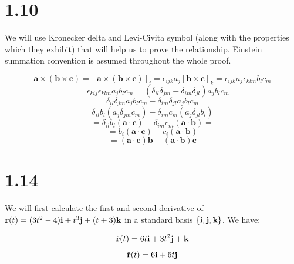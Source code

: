 \documentclass{article}
\begin{document}
\section*{1.10}

We will use Kronecker delta and Levi-Civita symbol (along with the properties which they exhibit)
that will help us to prove the relationship. Einstein
summation convention is assumed throughout the whole proof.


\begin{equation*}
    \mathbf{a} \times (\mathbf{b} \times \mathbf{c}) = [\mathbf{a} \times (\mathbf{b} \times \mathbf{c})]_{i} = \epsilon_{ijk}a_{j}[\mathbf{b} \times \mathbf{c}]_{k} = \epsilon_{ijk}a_{j}\epsilon_{klm}b_{l}c_{m}
\end{equation*}
\begin{equation*}
    = \epsilon_{kij}\epsilon_{klm}a_{j}b_{l}c_{m} = (\delta_{il}\delta_{jm} - \delta_{im}\delta_{jl})a_{j}b_{l}c_{m}
\end{equation*}
\begin{equation*}
    = \delta_{il}\delta_{jm}a_{j}b_{l}c_{m} - \delta_{im}\delta_{jl}a_{j}b_{l}c_{m} = 
\end{equation*}
\begin{equation*}
    = \delta_{il}b_{l}(a_{j}\delta_{jm}c_{m}) - \delta_{im}c_{m}(a_{j}\delta_{jl}b_{l}) =
\end{equation*}
\begin{equation*}
    = \delta_{il}b_{l}(\mathbf{a} \cdot \mathbf{c}) - \delta_{im}c_{m}(\mathbf{a} \cdot \mathbf{b}) = 
\end{equation*}
\begin{equation*}
    = b_{i}(\mathbf{a} \cdot \mathbf{c}) - c_{i}(\mathbf{a} \cdot \mathbf{b})
\end{equation*}
\begin{equation*}
    = (\mathbf{a} \cdot \mathbf{c})\mathbf{b} - (\mathbf{a} \cdot \mathbf{b})\mathbf{c}
\end{equation*}

\section*{1.14}

We will first calculate the first and second derivative of 
\(\vb{r}(t) = (3t^{2} - 4)\vb{i} + t^{3}\vb{j} + (t+3)\vb{k}\) in a standard basis \(\{\vb{i}, \vb{j}, \vb{k}\}\).
We have:

\begin{equation*}
    \dot{\vb{r}}(t) = 6t\vb{i} + 3t^{2}\vb{j} + \vb{k}
\end{equation*}
\begin{equation*}
    \ddot{\vb{r}}(t) = 6\vb{i} + 6t\vb{j}
\end{equation*}
\end{document}

